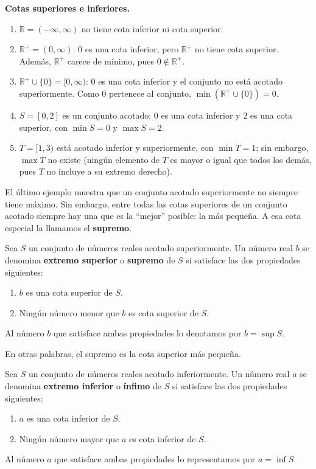\documentclass[12pt,a4paper]{book}
\begin{document}
  \begin{ejemplo}
    \textbf{Cotas superiores e inferiores.}
    \begin{enumerate}[label=(\arabic*)]
      \item $\mathbb{R}=(-\infty,\infty)$ no tiene cota inferior ni cota superior.
      \item $\mathbb{R}^+=(0,\infty)$: $0$ es una cota inferior, pero $\mathbb{R}^+$ no tiene cota superior. Además, $\mathbb{R}^+$ carece de mínimo, pues $0\notin\mathbb{R}^+$.
      \item $\mathbb{R}^+\cup\{0\}=[0,\infty)$: $0$ es una cota inferior y el conjunto no está acotado superiormente. Como $0$ pertenece al conjunto, $\min(\mathbb{R}^+\cup\{0\})=0$.
      \item $S=[0,2]$ es un conjunto acotado: $0$ es una cota inferior y $2$ es una cota superior, con $\min S=0$ y $\max S=2$.
      \item $T=[1,3)$ está acotado inferior y superiormente, con $\min T=1$; sin embargo, $\max T$ no existe (ningún elemento de $T$ es mayor o igual que todos los demás, pues $T$ no incluye a su extremo derecho).
    \end{enumerate}
  \end{ejemplo}
  
  El último ejemplo muestra que un conjunto acotado superiormente no siempre tiene máximo. Sin embargo, entre todas las cotas superiores de un conjunto acotado siempre hay una que es la ``mejor'' posible: la más pequeña. A esa cota especial la llamamos el \textbf{supremo}.
  
  \begin{definicion}[Supremo]
    Sea $S$ un conjunto de números reales acotado superiormente. Un número real $b$ se denomina \textbf{extremo superior} o \textbf{supremo} de $S$ si satisface las dos propiedades siguientes:
    \begin{enumerate}[label=(\arabic*)]
      \item $b$ es una cota superior de $S$.
      \item Ningún número menor que $b$ es cota superior de $S$.
    \end{enumerate}
    Al número $b$ que satisface ambas propiedades lo denotamos por $b=\sup S$.
  \end{definicion}
  
  En otras palabras, el supremo es la cota superior más pequeña.
  
  \begin{definicion}[Ínfimo]
    Sea $S$ un conjunto de números reales acotado inferiormente. Un número real $a$ se denomina \textbf{extremo inferior} o \textbf{ínfimo} de $S$ si satisface las dos propiedades siguientes:
    \begin{enumerate}[label=(\arabic*)]
      \item $a$ es una cota inferior de $S$.
      \item Ningún número mayor que $a$ es cota inferior de $S$.
    \end{enumerate}
    Al número $a$ que satisface ambas propiedades lo representamos por $a=\inf S$.
  \end{definicion}
  
\end{document}
